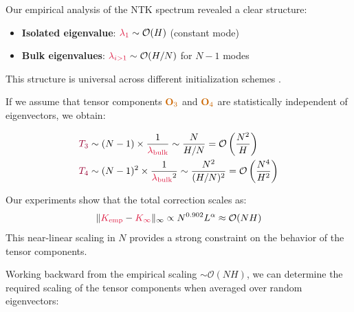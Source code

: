 \documentclass[a4paper]{article}
\theoremstyle{plain}
\theoremstyle{definition}
\theoremstyle{remark}
\begin{document}
\begin{tcolorbox}[colback=green!10,colframe=green!60!black,title={\textbf{📈 GENERAL REMARK: Spectral Structure}},enhanced,drop shadow]
Our empirical analysis of the \textcolor{kernelcolor}{NTK} spectrum revealed a clear structure:
\begin{itemize}
\item \textbf{Isolated eigenvalue}: $\textcolor{kernelcolor}{\lambda_1} \sim \mathcal{O}(H)$ (constant mode)
\item \textbf{Bulk eigenvalues}: $\textcolor{kernelcolor}{\lambda_{i>1}} \sim \mathcal{O}(H/N)$ for $N-1$ modes
\end{itemize}
This structure is universal across different initialization schemes \cite{hanin_nica_2019}.
\end{tcolorbox}

\begin{tcolorbox}[colback=blue!10,colframe=blue!60!black,title={\textbf{💭 INITIAL SCALING ESTIMATE}},enhanced,drop shadow]
If we assume that tensor components $\textcolor{orange!80!black}{\mathbf{O}_3}$ and $\textcolor{orange!80!black}{\mathbf{O}_4}$ are statistically independent of eigenvectors, we obtain:
\end{tcolorbox}

\begin{align}
\textcolor{purple!80!black}{T_3} &\sim (N-1) \times \frac{1}{\textcolor{kernelcolor}{\lambda_{\text{bulk}}}} \sim \frac{N}{H/N} = \mathcal{O}\left(\frac{N^2}{H}\right) \label{eq:T3_naive_scaling}\\
\textcolor{purple!80!black}{T_4} &\sim (N-1)^2 \times \frac{1}{\textcolor{kernelcolor}{\lambda_{\text{bulk}}}^2} \sim \frac{N^2}{(H/N)^2} = \mathcal{O}\left(\frac{N^4}{H^2}\right) \label{eq:T4_naive_scaling}
\end{align}

\begin{tcolorbox}[colback=orange!15,colframe=orange!70!black,title={\textbf{📊 EMPIRICAL CONSTRAINT: Observed Scaling}},enhanced,drop shadow]
Our experiments show that the total correction scales as:
\[
\|\textcolor{kernelcolor}{K_{\text{emp}}} - \textcolor{kernelcolor}{K_{\infty}}\|_\infty \propto N^{0.902} L^{\alpha} \approx \mathcal{O}(NH)
\]
This near-linear scaling in $N$ provides a strong constraint on the behavior of the tensor components.
\end{tcolorbox}

\begin{tcolorbox}[colback=blue!10,colframe=blue!60!black,title={\textbf{💡 BACKWARD CALCULATION: Deriving $\textcolor{orange!80!black}{\mathbf{O}_4}$ Scaling}},enhanced,drop shadow]
Working backward from the empirical scaling $\sim \mathcal{O}(NH)$, we can determine the required scaling of the tensor components when averaged over random eigenvectors:
\end{tcolorbox}
\end{document}

